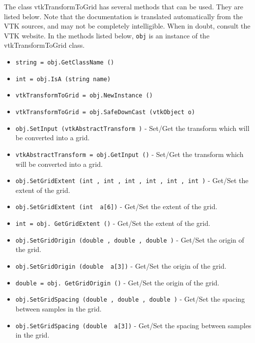 The class vtkTransformToGrid has several methods that can be used.
  They are listed below.
Note that the documentation is translated automatically from the VTK sources,
and may not be completely intelligible.  When in doubt, consult the VTK website.
In the methods listed below, \verb|obj| is an instance of the vtkTransformToGrid class.
\begin{itemize}
\item  \verb|string = obj.GetClassName ()|

\item  \verb|int = obj.IsA (string name)|

\item  \verb|vtkTransformToGrid = obj.NewInstance ()|

\item  \verb|vtkTransformToGrid = obj.SafeDownCast (vtkObject o)|

\item  \verb|obj.SetInput (vtkAbstractTransform )| -  Set/Get the transform which will be converted into a grid.

\item  \verb|vtkAbstractTransform = obj.GetInput ()| -  Set/Get the transform which will be converted into a grid.

\item  \verb|obj.SetGridExtent (int , int , int , int , int , int )| -  Get/Set the extent of the grid.

\item  \verb|obj.SetGridExtent (int  a[6])| -  Get/Set the extent of the grid.

\item  \verb|int = obj. GetGridExtent ()| -  Get/Set the extent of the grid.

\item  \verb|obj.SetGridOrigin (double , double , double )| -  Get/Set the origin of the grid.

\item  \verb|obj.SetGridOrigin (double  a[3])| -  Get/Set the origin of the grid.

\item  \verb|double = obj. GetGridOrigin ()| -  Get/Set the origin of the grid.

\item  \verb|obj.SetGridSpacing (double , double , double )| -  Get/Set the spacing between samples in the grid.

\item  \verb|obj.SetGridSpacing (double  a[3])| -  Get/Set the spacing between samples in the grid.


\end{itemize}
